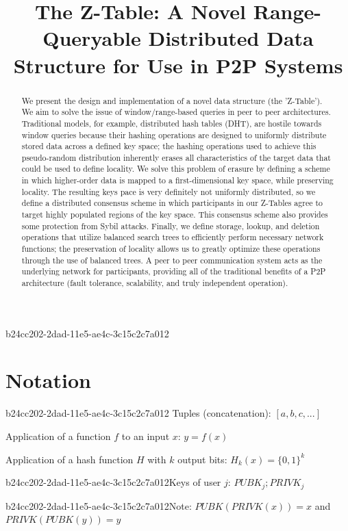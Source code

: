 \documentclass[12pt]{article}
\title{The Z-Table: A Novel Range-Queryable Distributed Data Structure for Use in P2P Systems}
\begin{document}
b24cc202-2dad-11e5-ae4c-3c15c2c7a012\maketitle

\begin{abstract}
We present the design and implementation of a novel data structure (the 'Z-Table'). We aim to solve the issue of window/range-based queries in peer to peer architectures. Traditional models, for example,  distributed hash tables (DHT), are hostile towards window queries because their hashing operations are designed to uniformly distribute stored data across a defined key space; the hashing operations used to achieve this pseudo-random distribution inherently erases all characteristics of the target data that could be used to define locality. We solve this problem of erasure by defining a scheme in which higher-order data is mapped to a first-dimensional key space, while preserving locality. The resulting keys pace is very definitely not uniformly distributed, so we define a distributed consensus scheme in which participants in our Z-Tables agree to target highly populated regions of the key space. This consensus scheme also provides some protection from Sybil attacks. Finally, we define storage, lookup, and deletion operations that utilize balanced search trees to efficiently perform necessary network functions; the preservation of locality allows us to greatly optimize these operations through the use of balanced trees. A peer to peer communication system acts as the underlying network for participants, providing all of the traditional benefits of a P2P architecture (fault tolerance, scalability, and truly independent operation).
\end{abstract}

\section{Notation}
b24cc202-2dad-11e5-ae4c-3c15c2c7a012
Tuples (concatenation): $[a,b,c,...]$

Application of a function $f$ to an input $x$: $y=f(x)$

Application of a hash function $H$ with $k$ output bits: $H_{k}(x) = \{0,1\}^k$

b24cc202-2dad-11e5-ae4c-3c15c2c7a012Keys of user $j$: $ PUBK_j; PRIVK_j $

b24cc202-2dad-11e5-ae4c-3c15c2c7a012Note: $PUBK(PRIVK(x)) = x$ and $PRIVK(PUBK(y)) = y$~
\end{document}
